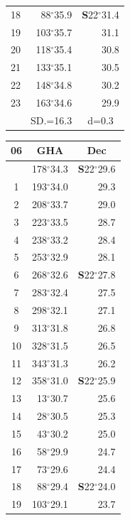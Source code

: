 \documentclass[10pt, a4paper]{report}
\begin{document}
\begin{scriptsize}
\begin{tabular*}{0.2\textwidth}[t]{@{\extracolsep{\fill}}|c|rr|}
18 & 88$^\circ$35.9 & \textbf{S}22$^\circ$31.4\\
19 & 103$^\circ$35.7 & 31.1\\
20 & 118$^\circ$35.4 & 30.8\\
21 & 133$^\circ$35.1 & \raisebox{0.24ex}{\boldmath$\cdot$~\boldmath$\cdot$~~}30.5\\
22 & 148$^\circ$34.8 & 30.2\\
23 & 163$^\circ$34.6 & 29.9\\
\hline
\rule{0pt}{2.4ex} & \multicolumn{1}{c}{SD.=16.3} & \multicolumn{1}{c|}{d=0.3}\\
\hline
\end{tabular*}\noindent
\begin{tabular*}{0.2\textwidth}[t]{@{\extracolsep{\fill}}|c|rr|}
\hline
\multicolumn{1}{|c|}{\rule{0pt}{2.6ex}\textbf{06}} & \multicolumn{1}{c}{\textbf{GHA}} & \multicolumn{1}{c|}{\textbf{Dec}}\\
\hline\rule{0pt}{2.6ex}\noindent
0 & 178$^\circ$34.3 & \textbf{S}22$^\circ$29.6\\
1 & 193$^\circ$34.0 & 29.3\\
2 & 208$^\circ$33.7 & 29.0\\
3 & 223$^\circ$33.5 & \raisebox{0.24ex}{\boldmath$\cdot$~\boldmath$\cdot$~~}28.7\\
4 & 238$^\circ$33.2 & 28.4\\
5 & 253$^\circ$32.9 & 28.1\\[2Pt]
6 & 268$^\circ$32.6 & \textbf{S}22$^\circ$27.8\\
7 & 283$^\circ$32.4 & 27.5\\
8 & 298$^\circ$32.1 & 27.1\\
9 & 313$^\circ$31.8 & \raisebox{0.24ex}{\boldmath$\cdot$~\boldmath$\cdot$~~}26.8\\
10 & 328$^\circ$31.5 & 26.5\\
11 & 343$^\circ$31.3 & 26.2\\[2Pt]
12 & 358$^\circ$31.0 & \textbf{S}22$^\circ$25.9\\
13 & 13$^\circ$30.7 & 25.6\\
14 & 28$^\circ$30.5 & 25.3\\
15 & 43$^\circ$30.2 & \raisebox{0.24ex}{\boldmath$\cdot$~\boldmath$\cdot$~~}25.0\\
16 & 58$^\circ$29.9 & 24.7\\
17 & 73$^\circ$29.6 & 24.4\\[2Pt]
18 & 88$^\circ$29.4 & \textbf{S}22$^\circ$24.0\\
19 & 103$^\circ$29.1 & 23.7\\

\end{tabular*}
\end{scriptsize}
\end{document}
